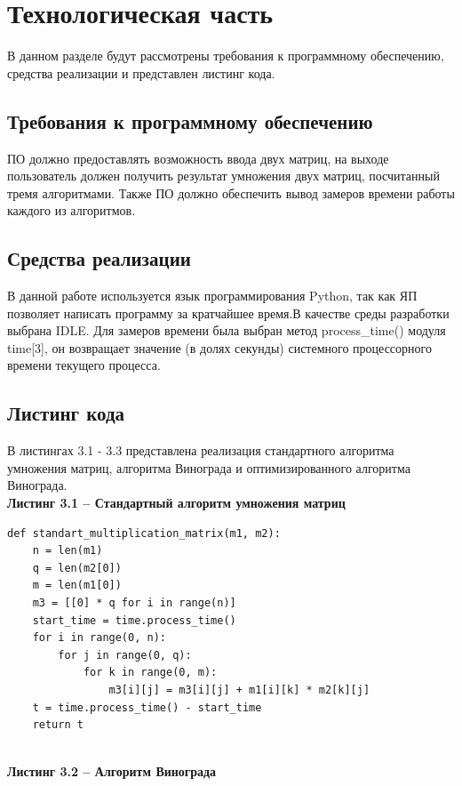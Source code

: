 \documentclass[a4paper,12pt]{article}
\begin{document}
	\section{Технологическая часть}
	\hfill
	
	В данном разделе будут рассмотрены требования к программному обеспечению, средства реализации и представлен листинг кода.
	\subsection{Требования к программному обеспечению}
	\hfill
	
	ПО должно предоставлять возможность ввода двух матриц, на выходе пользователь должен получить результат умножения двух матриц, посчитанный тремя алгоритмами. Также ПО должно обеспечить вывод замеров времени работы каждого из алгоритмов.
	
	\subsection{Средства реализации}
	\hfill
	
	В данной работе используется язык программирования Python, так как ЯП позволяет написать программу за кратчайшее время.В качестве среды разработки выбрана IDLE. Для замеров времени была выбран метод process\_time() модуля time[3], он возвращает значение (в долях секунды) системного процессорного времени текущего процесса.
	
	\subsection{Листинг кода}
	\hfill
	
	В листингах 3.1 - 3.3 представлена реализация стандартного алгоритма умножения матриц, алгоритма Винограда и оптимизированного алгоритма Винограда.
	\lstset{ %
		language=Python,                %
		numbers=left,                   %
	}
	\textbf{\\Листинг 3.1 -- Стандартный алгоритм умножения матриц}
	
	\begin{lstlisting}
def standart_multiplication_matrix(m1, m2):
	n = len(m1)  
	q = len(m2[0])   
	m = len(m1[0])   
	m3 = [[0] * q for i in range(n)]
	start_time = time.process_time()
	for i in range(0, n):
		for j in range(0, q):
			for k in range(0, m):
				m3[i][j] = m3[i][j] + m1[i][k] * m2[k][j]
	t = time.process_time() - start_time
	return t
	\end{lstlisting}
	\textbf{\\Листинг 3.2 -- Алгоритм Винограда }
	
\end{document}

